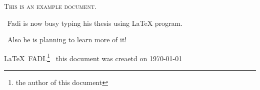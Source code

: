 \documentclass[12pt,a4,parskip=full]{scrreprt} %
\begin{document}
\textsc{This is an example document.}\par 
\ Fadi is now busy typing his thesis using LaTeX program.\par
\ Also he is planning to learn more of it!\par
\LaTeX\ {FADI.}\footnote{the author of this document} 
\ this document was creaetd on \today
\end{document}
